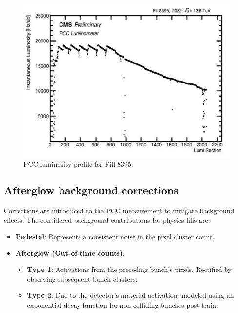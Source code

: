 \begin{figure}[H]
\centering
\includegraphics[width=1\textwidth]{ashish_thesis/Fill_profile_8274_1.png}
\caption[Fill 8274 Luminosity Profile]{%
  PCC luminosity profile for Fill 8395.
}
\label{fig:period_bound_111}
\end{figure}

\newpage
\subsection{Afterglow background corrections}


Corrections are introduced to the PCC measurement to mitigate background effects. The considered background contributions for physics fills are:

\begin{itemize}
    \item \textbf{Pedestal}: Represents a consistent noise in the pixel cluster count.
    
    \item \textbf{Afterglow (Out-of-time counts)}:
    \begin{itemize}
        \item \textbf{Type 1}: Activations from the preceding bunch's pixels. Rectified by observing subsequent bunch clusters.
        
        \item \textbf{Type 2}: Due to the detector's material activation, modeled using an exponential decay function for non-colliding bunches post-train.
    \end{itemize}
\end{itemize}

